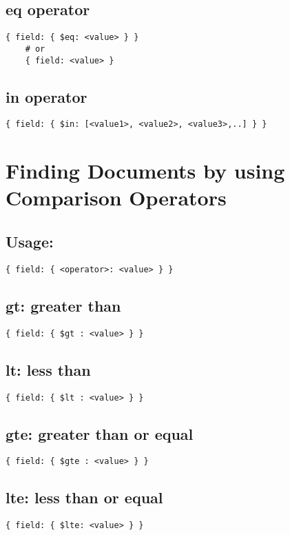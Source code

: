 \documentclass[../main.tex]{subfiles}
\begin{document}
\subsection{eq operator}
\begin{lstlisting}[language=MongoDB]
	{ field: { $eq: <value> } }
	# or
	{ field: <value> }
\end{lstlisting}

\subsection{in operator}
\begin{lstlisting}[language=MongoDB]
{ field: { $in: [<value1>, <value2>, <value3>,..] } }
\end{lstlisting}

\section{Finding Documents by using Comparison Operators}
\subsection{Usage:}
\begin{lstlisting}[language=MongoDB]
{ field: { <operator>: <value> } }
\end{lstlisting}
\subsection{gt: greater than}
\begin{lstlisting}[language=MongoDB]
{ field: { $gt : <value> } }
\end{lstlisting}
\subsection{lt: less than}
\begin{lstlisting}[language=MongoDB]
{ field: { $lt : <value> } }
\end{lstlisting}
\subsection{gte: greater than or equal}
\begin{lstlisting}[language=MongoDB]
{ field: { $gte : <value> } }
\end{lstlisting}
\subsection{lte: less than or equal}
\begin{lstlisting}[language=MongoDB]
{ field: { $lte: <value> } }
\end{lstlisting}
\end{document}
